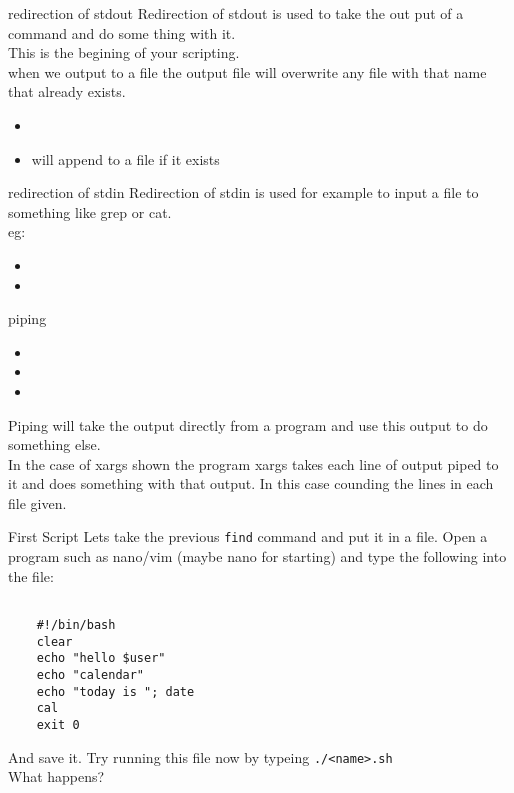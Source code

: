 \documentclass{beamer}
\begin{document}
\begin{frame}{redirection of stdout}
    Redirection of stdout is used to take the out put of a command and do some thing with it.\\ This is the begining of your scripting.\\when we output to a file the output file will overwrite any file with that name that already exists.
    \begin{itemize} 
        \item {}
        \item {} will append to a file if it exists
    \end{itemize}
\end{frame}

\begin{frame}{redirection of stdin}
    Redirection of stdin is used for example to input a file to something like grep or cat.\\ eg: 
    \begin{itemize} 
        \item {}
        \item {}
    \end{itemize}
\end{frame}

\begin{frame}{piping}
    \begin{itemize} 
        \item {}
        \item {}
        \item {}
    \end{itemize}
    Piping will take the output directly from a program and use this output to do something else.\\In the case of xargs shown the program xargs takes each line of output piped to it and does something with that output. In this case counding the lines in each file given.
\end{frame}

\begin{frame}[fragile]{First Script}
Lets take the previous \texttt{find} command and put it in a file. Open a program such as nano/vim (maybe nano for starting) and type the following into the file:

    \begin{verbatim}

    #!/bin/bash
    clear
    echo "hello $user"
    echo "calendar"
    echo "today is "; date
    cal
    exit 0
    \end{verbatim}
    And save it. Try running this file now by typeing \texttt{./<name>.sh}\\
    What happens?

\end{frame}
\end{document}
